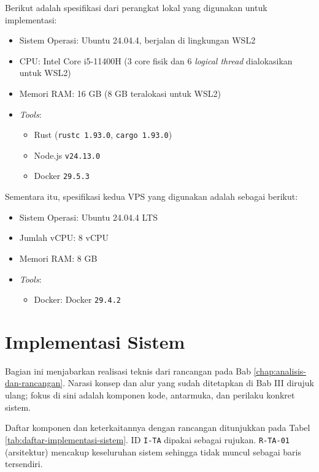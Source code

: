 \documentclass[bahasa, 12pt, a4paper, onecolumn, oneside, final]{report}
\begin{document}
Berikut adalah spesifikasi dari perangkat lokal yang digunakan untuk implementasi:
\begin{itemize}
	\item Sistem Operasi: Ubuntu 24.04.4, berjalan di lingkungan WSL2
	\item CPU: Intel Core i5-11400H (3 core fisik dan 6 \textit{logical thread} dialokasikan untuk WSL2)
	\item Memori RAM: 16 GB (8 GB teralokasi untuk WSL2)
	\item \textit{Tools}:
	      \begin{itemize}
		      \item Rust (\texttt{rustc 1.93.0}, \texttt{cargo 1.93.0})
		      \item Node.js \texttt{v24.13.0}
		      \item Docker \texttt{29.5.3}
	      \end{itemize}
\end{itemize}

Sementara itu, spesifikasi kedua VPS yang digunakan adalah sebagai berikut:
\begin{itemize}
	\item Sistem Operasi: Ubuntu 24.04.4 LTS
	\item Jumlah vCPU: 8 vCPU
	\item Memori RAM: 8 GB
	\item \textit{Tools}:
	      \begin{itemize}
		      \item Docker: Docker \texttt{29.4.2}
	      \end{itemize}
\end{itemize} \section{Implementasi Sistem}
\label{sec:implementasi-sistem}

Bagian ini menjabarkan realisasi teknis dari rancangan pada Bab \ref{chap:analisis-dan-rancangan}. Narasi konsep dan alur yang sudah ditetapkan di Bab III dirujuk ulang; fokus di sini adalah komponen kode, antarmuka, dan perilaku konkret sistem.

Daftar komponen dan keterkaitannya dengan rancangan ditunjukkan pada Tabel \ref{tab:daftar-implementasi-sistem}. ID \texttt{I-TA} dipakai sebagai rujukan. \texttt{R-TA-01} (arsitektur) mencakup keseluruhan sistem sehingga tidak muncul sebagai baris tersendiri.
\end{document}
